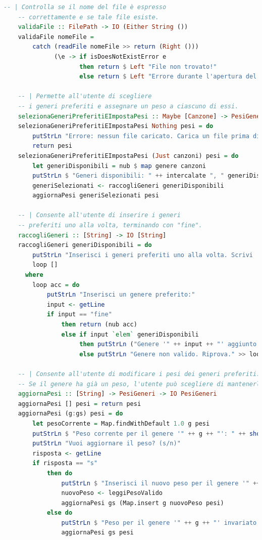 \documentclass[a4paper,11pt]{article}
\begin{document}
\begin{lstlisting}[language=Haskell]
    -- | Controlla se il nome del file è espresso
    -- correttamente e se tale file esiste.
    validaFile :: FilePath -> IO (Either String ())
    validaFile nomeFile =
        catch (readFile nomeFile >> return (Right ()))
              (\e -> if isDoesNotExistError e
                     then return $ Left "File non trovato!"
                     else return $ Left "Errore durante l'apertura del file.")
    
    -- | Permette all'utente di scegliere
    -- i generi preferiti e assegnare un peso a ciascuno di essi.
    selezionaGeneriPreferitiEImpostaPesi :: Maybe [Canzone] -> PesiGeneri -> IO PesiGeneri
    selezionaGeneriPreferitiEImpostaPesi Nothing pesi = do
        putStrLn "Errore: nessun file caricato. Carica un file prima di continuare."
        return pesi
    selezionaGeneriPreferitiEImpostaPesi (Just canzoni) pesi = do
        let generiDisponibili = nub $ map genere canzoni
        putStrLn $ "Generi disponibili: " ++ intercalate ", " generiDisponibili
        generiSelezionati <- raccogliGeneri generiDisponibili
        aggiornaPesi generiSelezionati pesi
    
    -- | Consente all'utente di inserire i generi
    -- preferiti uno alla volta, terminando con "fine".
    raccogliGeneri :: [String] -> IO [String]
    raccogliGeneri generiDisponibili = do
        putStrLn "Inserisci i generi preferiti uno alla volta. Scrivi 'fine' per terminare."
        loop []
      where
        loop acc = do
            putStrLn "Inserisci un genere preferito:"
            input <- getLine
            if input == "fine"
                then return (nub acc)
                else if input `elem` generiDisponibili
                     then putStrLn ("Genere '" ++ input ++ "' aggiunto ai preferiti.") >> loop (input : acc)
                     else putStrLn "Genere non valido. Riprova." >> loop acc
    
    -- | Consente all'utente di modificare i pesi dei generi preferiti.
    -- Se il genere ha già un peso, l'utente può scegliere di mantenerlo o aggiornarlo.
    aggiornaPesi :: [String] -> PesiGeneri -> IO PesiGeneri
    aggiornaPesi [] pesi = return pesi
    aggiornaPesi (g:gs) pesi = do
        let pesoCorrente = Map.findWithDefault 1.0 g pesi
        putStrLn $ "Peso corrente per il genere '" ++ g ++ "': " ++ show pesoCorrente
        putStrLn "Vuoi aggiornare il peso? (s/n)"
        risposta <- getLine
        if risposta == "s"
            then do
                putStrLn $ "Inserisci il nuovo peso per il genere '" ++ g ++ "':"
                nuovoPeso <- leggiPesoValido
                aggiornaPesi gs (Map.insert g nuovoPeso pesi)
            else do
                putStrLn $ "Peso per il genere '" ++ g ++ "' invariato."
                aggiornaPesi gs pesi
    

\end{lstlisting}
\end{document}
